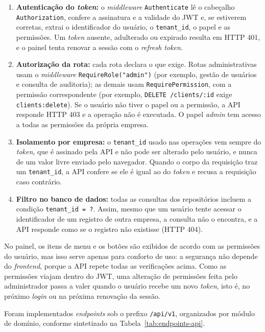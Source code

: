 \begin{enumerate}
\item \textbf{Autenticação do \textit{token}:} o \textit{middleware} \texttt{Authenticate} lê o cabeçalho \texttt{Authorization}, confere a assinatura e a validade do JWT e, se estiverem corretas, extrai o identificador do usuário, o \texttt{tenant\_id}, o papel e as permissões. Um \textit{token} ausente, adulterado ou expirado resulta em HTTP 401, e o painel tenta renovar a sessão com o \textit{refresh token}.
\item \textbf{Autorização da rota:} cada rota declara o que exige. Rotas administrativas usam o \textit{middleware} \texttt{RequireRole("admin")} (por exemplo, gestão de usuários e consulta de auditoria); as demais usam \texttt{RequirePermission}, com a permissão correspondente (por exemplo, \texttt{DELETE /\allowbreak{}clients/\allowbreak{}:id} exige \texttt{clients:delete}). Se o usuário não tiver o papel ou a permissão, a API responde HTTP 403 e a operação não é executada. O papel \textit{admin} tem acesso a todas as permissões da própria empresa.
\item \textbf{Isolamento por empresa:} o \texttt{tenant\_id} usado nas operações vem sempre do \textit{token}, que é assinado pela API e não pode ser alterado pelo usuário, e nunca de um valor livre enviado pelo navegador. Quando o corpo da requisição traz um \texttt{tenant\_id}, a API confere se ele é igual ao do \textit{token} e recusa a requisição caso contrário.
\item \textbf{Filtro no banco de dados:} todas as consultas dos repositórios incluem a condição \texttt{tenant\_id = ?}. Assim, mesmo que um usuário tente acessar o identificador de um registro de outra empresa, a consulta não o encontra, e a API responde como se o registro não existisse (HTTP 404).
\end{enumerate}

No painel, os itens de menu e os botões são exibidos de acordo com as permissões do usuário, mas isso serve apenas para conforto de uso: a segurança não depende do \textit{frontend}, porque a API repete todas as verificações acima. Como as permissões viajam dentro do JWT, uma alteração de permissões feita pelo administrador passa a valer quando o usuário recebe um novo \textit{token}, isto é, no próximo \textit{login} ou na próxima renovação da sessão.

Foram implementados \textit{endpoints} sob o prefixo \texttt{/\allowbreak{}api/\allowbreak{}v1}, organizados por módulo de domínio, conforme sintetizado na Tabela~\ref{tab:endpoints-api}.

